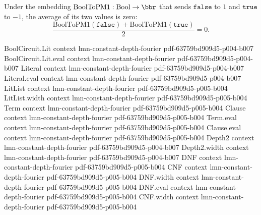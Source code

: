 \begin{lemma}
\label{BoolFourier.avg_BoolToPM1}
\leanok
{}
Under the embedding $\mathrm{BoolToPM1} : \mathrm{Bool} \to \bbr$ that sends
$\mathtt{false}$ to $1$ and $\mathtt{true}$ to $-1$, the average of its two values is
zero:
\[
  \frac{\mathrm{BoolToPM1}(\mathtt{false}) + \mathrm{BoolToPM1}(\mathtt{true})}{2} = 0.
\]
\end{lemma}

\begin{lemma}
\label{BoolFourier.BoolToPM1_sq}
\leanok
{}
\proofstep
  {BoolCircuit.Lit}
  {context}
  {lmn-constant-depth-fourier}
  {pdf-63759bd909d5-p004-b007}
\proofstep
  {BoolCircuit.Lit.eval}
  {context}
  {lmn-constant-depth-fourier}
  {pdf-63759bd909d5-p004-b007}
\proofstep
  {Literal}
  {context}
  {lmn-constant-depth-fourier}
  {pdf-63759bd909d5-p004-b007}
\proofstep
  {Literal.eval}
  {context}
  {lmn-constant-depth-fourier}
  {pdf-63759bd909d5-p004-b007}
\proofstep
  {LitList}
  {context}
  {lmn-constant-depth-fourier}
  {pdf-63759bd909d5-p005-b004}
\proofstep
  {LitList.width}
  {context}
  {lmn-constant-depth-fourier}
  {pdf-63759bd909d5-p005-b004}
\proofstep
  {Term}
  {context}
  {lmn-constant-depth-fourier}
  {pdf-63759bd909d5-p005-b004}
\proofstep
  {Clause}
  {context}
  {lmn-constant-depth-fourier}
  {pdf-63759bd909d5-p005-b004}
\proofstep
  {Term.eval}
  {context}
  {lmn-constant-depth-fourier}
  {pdf-63759bd909d5-p005-b004}
\proofstep
  {Clause.eval}
  {context}
  {lmn-constant-depth-fourier}
  {pdf-63759bd909d5-p005-b004}
\proofstep
  {Depth2}
  {context}
  {lmn-constant-depth-fourier}
  {pdf-63759bd909d5-p004-b007}
\proofstep
  {Depth2.width}
  {context}
  {lmn-constant-depth-fourier}
  {pdf-63759bd909d5-p004-b007}
\proofstep
  {DNF}
  {context}
  {lmn-constant-depth-fourier}
  {pdf-63759bd909d5-p005-b004}
\proofstep
  {CNF}
  {context}
  {lmn-constant-depth-fourier}
  {pdf-63759bd909d5-p005-b004}
\proofstep
  {DNF.width}
  {context}
  {lmn-constant-depth-fourier}
  {pdf-63759bd909d5-p005-b004}
\proofstep
  {DNF.eval}
  {context}
  {lmn-constant-depth-fourier}
  {pdf-63759bd909d5-p005-b004}
\proofstep
  {CNF.width}
  {context}
  {lmn-constant-depth-fourier}
  {pdf-63759bd909d5-p005-b004}
\proofstep

\end{lemma}
